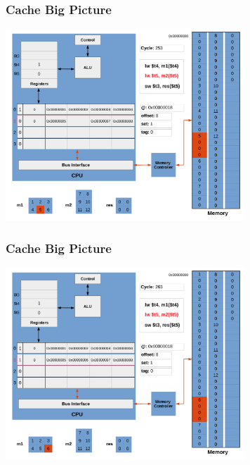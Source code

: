 \documentclass{beamer}
\begin{document}
\begin{frame}[fragile]
\frametitle{Cache Big Picture}

\begin{center}
\vspace*{-0.23cm}
\hspace*{-1cm}\includegraphics[width=9cm]{cache13.pdf}
\end{center}

\end{frame}

\begin{frame}[fragile]
\frametitle{Cache Big Picture}

\begin{center}
\vspace*{-0.23cm}
\hspace*{-1cm}\includegraphics[width=9cm]{cache14.pdf}
\end{center}

\end{frame}
\end{document}
